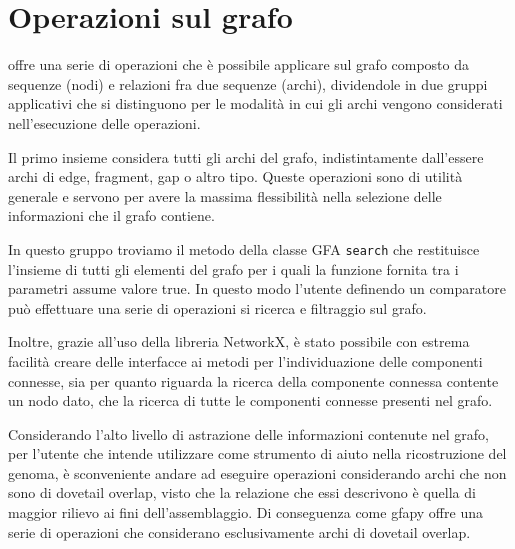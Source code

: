 \section{Operazioni sul grafo}
\pygfa offre una serie di operazioni che è possibile applicare sul grafo
composto da sequenze (nodi) e relazioni fra due sequenze (archi),
dividendole in due gruppi applicativi che si distinguono per le modalità
in cui gli archi vengono considerati nell'esecuzione delle operazioni.

Il primo insieme considera tutti gli archi del grafo, indistintamente dall'essere
archi di edge, fragment, gap o altro tipo. Queste operazioni sono
di utilità generale e servono per avere la massima flessibilità nella selezione delle
informazioni che il grafo contiene.

In questo gruppo troviamo il metodo della classe GFA \texttt{search} che
restituisce l'insieme di tutti gli elementi del grafo per i quali la funzione fornita
tra i parametri assume valore true. In questo modo l'utente definendo un
comparatore  può effettuare una serie di operazioni si ricerca e filtraggio sul grafo.

Inoltre, grazie all'uso della libreria NetworkX, è stato possibile con estrema facilità
creare delle interfacce ai metodi per l'individuazione delle componenti connesse, sia
per quanto riguarda la ricerca della componente connessa contente un nodo dato, che
la ricerca di tutte le componenti connesse presenti nel grafo.

Considerando l'alto livello di astrazione delle informazioni contenute
nel grafo, per l'utente che intende utilizzare \pygfa come strumento di
aiuto nella ricostruzione del genoma, è sconveniente andare ad eseguire
operazioni considerando archi che non sono di dovetail overlap, visto
che la relazione che essi descrivono è quella di maggior rilievo ai fini
dell'assemblaggio. Di conseguenza \pygfa come gfapy offre una serie
di operazioni che considerano esclusivamente archi di dovetail overlap.

